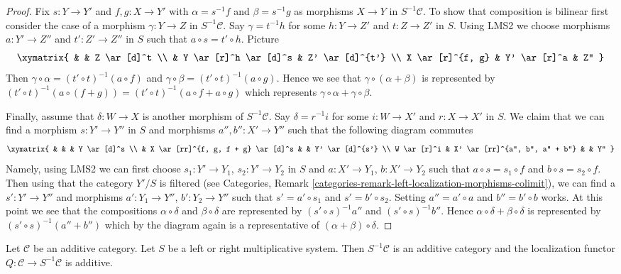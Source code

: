 \begin{proof}
\medskip\noindent
Fix $s : Y \to Y'$ and $f, g : X \to Y'$ with
$\alpha = s^{-1}f$ and $\beta = s^{-1}g$ as morphisms $X \to Y$
in $S^{-1}\mathcal{C}$.
To show that composition is bilinear first consider the case of a
morphism $\gamma : Y \to Z$ in $S^{-1}\mathcal{C}$. Say $\gamma = t^{-1}h$
for some $h : Y \to Z'$ and $t : Z \to Z'$ in $S$. Using LMS2 we
choose morphisms $a : Y' \to Z''$ and $t' : Z' \to Z''$ in $S$ such
that $a \circ s = t' \circ h$. Picture
$$
\xymatrix{
& & Z \ar[d]^t \\
& Y \ar[r]^h \ar[d]^s & Z' \ar[d]^{t'} \\
X \ar[r]^{f, g} & Y' \ar[r]^a & Z''
}
$$
Then
$\gamma \circ \alpha = (t' \circ t)^{-1}(a \circ f)$ and
$\gamma \circ \beta = (t' \circ t)^{-1}(a \circ g)$.
Hence we see that $\gamma \circ (\alpha + \beta)$ is represented
by $(t' \circ t)^{-1}(a \circ (f + g)) =
(t' \circ t)^{-1}(a \circ f + a \circ g)$ which represents
$\gamma \circ \alpha + \gamma \circ \beta$.

\medskip\noindent
Finally, assume that $\delta : W \to X$ is another morphism of
$S^{-1}\mathcal{C}$. Say $\delta = r^{-1}i$ for some
$i : W \to X'$ and $r : X \to X'$ in $S$. We claim that we can find
a morphism $s : Y' \to Y''$ in $S$ and morphisms $a'', b'' : X' \to Y''$
such that the following diagram commutes
$$
\xymatrix{
& & & Y \ar[d]^s \\
& X \ar[rr]^{f, g, f + g} \ar[d]^s & & Y' \ar[d]^{s'} \\
W \ar[r]^i & X' \ar[rr]^{a'', b'', a'' + b''} & & Y''
}
$$
Namely, using LMS2 we can first choose
$s_1 : Y' \to Y_1$, $s_2 : Y' \to Y_2$ in $S$ and
$a : X' \to Y_1$, $b : X' \to Y_2$ such that
$a \circ s = s_1 \circ f$ and $b \circ s = s_2 \circ f$.
Then using that the category $Y'/S$ is filtered (see
Categories, Remark \ref{categories-remark-left-localization-morphisms-colimit}),
we can
find a $s' : Y' \to Y''$ and morphisms $a' : Y_1 \to Y''$, $b' : Y_2 \to Y''$
such that $s' = a' \circ s_1$ and $s' = b' \circ s_2$. Setting
$a'' = a' \circ a$ and $b'' = b' \circ b$ works.
At this point we see that the compositions
$\alpha \circ \delta$ and $\beta \circ \delta$ are represented by
$(s' \circ s)^{-1}a''$ and $(s' \circ s)^{-1}b''$.
Hence $\alpha \circ \delta + \beta \circ \delta$ is represented
by $(s' \circ s)^{-1}(a'' + b'')$ which by the diagram again
is a representative of $(\alpha + \beta) \circ \delta$.
\end{proof}

\begin{lemma}
\label{lemma-localization-additive}
Let $\mathcal{C}$ be an additive category.
Let $S$ be a left or right multiplicative system.
Then $S^{-1}\mathcal{C}$ is an additive category and the localization functor
$Q : \mathcal{C} \to S^{-1}\mathcal{C}$ is additive.
\end{lemma}

